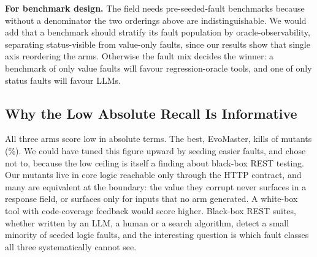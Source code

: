 \textbf{For benchmark design.} The field needs pre-seeded-fault benchmarks because without a
denominator the two orderings above are indistinguishable. We would add that a benchmark
should stratify its fault population by oracle-observability, separating status-visible from
value-only faults, since our results show that single axis reordering the arms. Otherwise the
fault mix decides the winner: a benchmark of only value faults will favour regression-oracle
tools, and one of only status faults will favour LLMs.

\subsection{Why the Low Absolute Recall Is Informative}

All three arms score low in absolute terms. The best, EvoMaster, kills \PDkilledEvo{} of
\PDkilledTotal{} mutants (\RQIIrecallEvoPct\%). We could have tuned this figure upward by
seeding easier faults, and chose not to, because the low ceiling is itself a finding about
black-box REST testing. Our mutants live in core logic reachable only through the HTTP
contract, and many are
equivalent at the boundary: the value they corrupt never surfaces in a response field, or
surfaces only for inputs that no arm generated. A white-box tool with code-coverage feedback
would score higher. Black-box REST suites, whether written by an LLM, a human or a search
algorithm, detect a small minority of seeded logic faults, and the interesting question is
which fault classes all three systematically cannot see.
